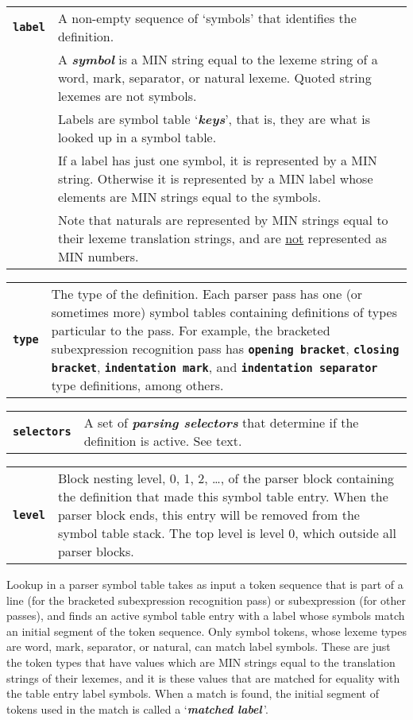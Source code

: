 \documentclass[12pt]{article}
\makeatletter
\newcommand{\TT}[1]{{\tt \bfseries #1}}
\newcommand{\key}[1]{{\bf \em #1}\index{#1}}
\newcommand{\skey}[2]{{\bf \em #1#2}\index{#1}}
\newcommand{\ttmkey}[2]{\TT{#1}\index{#1@{\tt #1}!#2}}
\newenvironment{indpar}[1][0.3in]%
	{\begin{list}{}%
		     {\setlength{\itemsep}{0in}%
		      \setlength{\topsep}{0in}%
		      \setlength{\parsep}{1ex}%
		      \setlength{\labelwidth}{#1}%
		      \setlength{\leftmargin}{#1}%
		      \addtolength{\leftmargin}{\labelsep}}%
	 \item}%
	{\end{list}}
\makeatother
\begin{document}
\begin{indpar}
\begin{tabular}{p{1in}p{4.5in}}
\ttmkey{label}{of symbol table entry}
		& A non-empty
		  sequence of `symbols' that identifies the definition.
\\[1ex]
		& A \key{symbol} is a MIN string equal to the
		  lexeme string of a word, mark, separator,
		  or natural lexeme.  Quoted string
		  lexemes are not symbols.
\\[1ex]
		& Labels are symbol table `\skey{key}s', that is, they
		  are what is looked up in a symbol table.
\\[1ex]
		& If a label has just one symbol, it is represented by
		  a MIN string.  Otherwise it is represented by
		  a MIN label whose elements are MIN strings
		  equal to the symbols.
\\[1ex]
		& Note that naturals are represented by MIN
		  strings equal to their lexeme translation strings,
		  and are \underline{not} represented as MIN numbers.
\end{tabular}

\begin{tabular}{p{1in}p{4.5in}}
\ttmkey{type}{of symbol table entry}
		& The type of the definition.  Each parser pass has
		  one (or sometimes more) symbol tables containing
		  definitions of types particular to the pass.
		  For example, the bracketed subexpression recognition
		  pass has \TT{opening bracket}, \TT{closing bracket},
		  \TT{indentation mark}, and \TT{indentation separator}
		  type definitions, among others.
\end{tabular}

\begin{tabular}{p{1in}p{4.5in}}
\ttmkey{selectors}{of symbol table entry}
		& A set of \skey{parsing selector}s that determine if
		  the definition is active.  See text.
\end{tabular}

\begin{tabular}{p{1in}p{4.5in}}
\ttmkey{level}{of symbol table entry}
		& Block nesting level, 0, 1, 2, \ldots, of the parser block
		  containing the definition that made this symbol
		  table entry.  When the parser block ends, this entry
		  will be removed from the symbol table stack.  The top level is
		  level 0, which outside all parser blocks.
\end{tabular}
\end{indpar}

Lookup in a parser symbol table takes as input a token sequence
that is part of a line (for the bracketed subexpression recognition pass)
or subexpression (for other passes), and finds an active symbol table
entry with a label whose symbols match an initial segment of the
token sequence.  Only symbol tokens, whose lexeme types are word,
mark, separator, or natural, can match label symbols.  These are just
the token types that have values which are MIN strings equal to the
translation strings of their lexemes, and it is these values that
are matched for equality with the table entry label symbols.
When a match is found,
the initial segment of tokens used in the match is called
a `\key{matched label}\,'.
\end{document}
